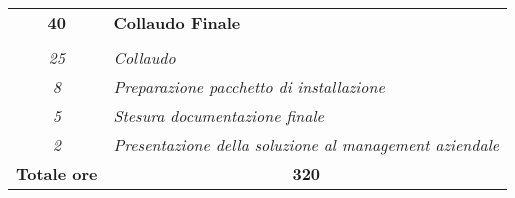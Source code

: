\begin{tabularx}{\textwidth}{|c|X|}
    \textbf{40} & \textbf{Collaudo Finale} \\ \hdashline 
    \multirow{4}{0cm}\\ 
    \textit{25} & 
    \textit{Collaudo} \\
    \textit{8} & 
    \textit{Preparazione pacchetto di installazione} \\
    \textit{5} & 
    \textit{Stesura documentazione finale} \\
    \textit{2} & 
    \textit{Presentazione della soluzione al management aziendale} \\
    \hline
	\textbf{Totale ore} & \multicolumn{1}{|c|}{\textbf{320}} \\\hline
	
	
\end{tabularx}